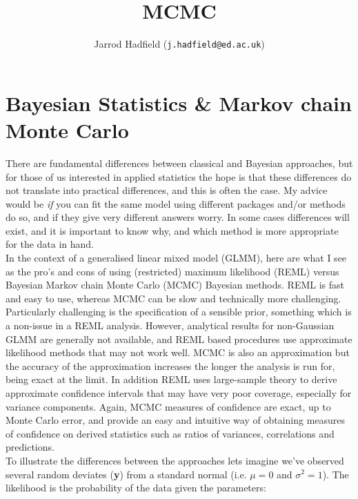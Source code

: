 \documentclass{article}
\title{MCMC}
\author{Jarrod Hadfield (\texttt{j.hadfield@ed.ac.uk})}
\begin{document}
\maketitle
\else
\chapter[Bayesian Statistics \& MCMC]{Bayesian Statistics \& Markov chain Monte Carlo}
\label{chap1}
\fi




There are fundamental differences between classical and Bayesian approaches, but for those of us interested in applied statistics the hope is that these differences do not translate into practical differences, and this is often the case. My advice would be \emph{if} you can fit the same model using different packages and/or methods do so, and if they give very different answers worry. In some cases differences will exist, and it is important to know why, and which method is more appropriate for the data in hand.\\

In the context of a generalised linear mixed model (GLMM), here are what I see as the pro's and cons of using (restricted) maximum likelihood (REML) versus Bayesian Markov chain Monte Carlo (MCMC) Bayesian methods. REML is fast and easy to use, whereas MCMC can be slow and technically more challenging. Particularly challenging is the specification of a sensible prior, something which is a non-issue in a REML analysis. However, analytical results for non-Gaussian GLMM are generally not available, and REML based procedures use approximate likelihood methods that may not work well. MCMC is also an approximation but the accuracy of the approximation increases the longer the analysis is run for, being exact at the limit. In addition REML uses large-sample theory to derive approximate confidence intervals that may have very poor coverage, especially for variance components.  Again, MCMC measures of confidence are exact, up to Monte Carlo error, and provide an easy and intuitive way of obtaining measures of confidence on derived statistics such as ratios of variances, correlations and predictions.\\
 

To illustrate the differences between the approaches lets imagine we've observed several random deviates ({\bf y}) from a standard normal (i.e. $\mu=0$ and $\sigma^{2}=1$).  The likelihood is the probability of the data given the parameters:
\end{document}
